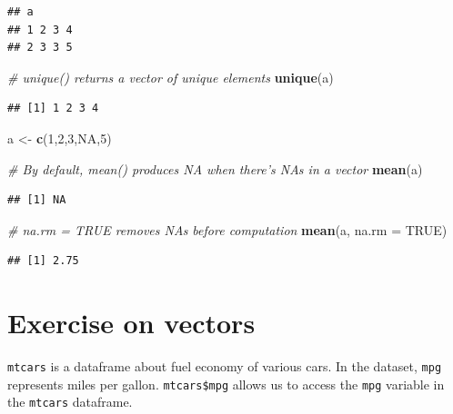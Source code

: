 \documentclass[]{book}
\newenvironment{Shaded}{\begin{snugshade}}{\end{snugshade}}
\newcommand{\CommentTok}[1]{\textcolor[rgb]{0.56,0.35,0.01}{\textit{#1}}}
\newcommand{\DataTypeTok}[1]{\textcolor[rgb]{0.13,0.29,0.53}{#1}}
\newcommand{\DecValTok}[1]{\textcolor[rgb]{0.00,0.00,0.81}{#1}}
\newcommand{\KeywordTok}[1]{\textcolor[rgb]{0.13,0.29,0.53}{\textbf{#1}}}
\newcommand{\NormalTok}[1]{#1}
\newcommand{\OtherTok}[1]{\textcolor[rgb]{0.56,0.35,0.01}{#1}}
\newcommand{\StringTok}[1]{\textcolor[rgb]{0.31,0.60,0.02}{#1}}
\begin{document}
\begin{verbatim}
## a
## 1 2 3 4 
## 2 3 3 5
\end{verbatim}

\begin{Shaded}
\begin{Highlighting}[]
\CommentTok{# unique() returns a vector of unique elements}
\KeywordTok{unique}\NormalTok{(a)}
\end{Highlighting}
\end{Shaded}

\begin{verbatim}
## [1] 1 2 3 4
\end{verbatim}

\begin{Shaded}
\begin{Highlighting}[]
\NormalTok{a <-}\StringTok{ }\KeywordTok{c}\NormalTok{(}\DecValTok{1}\NormalTok{,}\DecValTok{2}\NormalTok{,}\DecValTok{3}\NormalTok{,}\OtherTok{NA}\NormalTok{,}\DecValTok{5}\NormalTok{)}
\end{Highlighting}
\end{Shaded}

\begin{Shaded}
\begin{Highlighting}[]
\CommentTok{# By default, mean() produces NA when there's NAs in a vector}
\KeywordTok{mean}\NormalTok{(a)}
\end{Highlighting}
\end{Shaded}

\begin{verbatim}
## [1] NA
\end{verbatim}

\begin{Shaded}
\begin{Highlighting}[]
\CommentTok{# na.rm = TRUE removes NAs before computation}
\KeywordTok{mean}\NormalTok{(a, }\DataTypeTok{na.rm =} \OtherTok{TRUE}\NormalTok{)}
\end{Highlighting}
\end{Shaded}

\begin{verbatim}
## [1] 2.75
\end{verbatim}

\hypertarget{exercise-on-vectors}{%
\section{Exercise on vectors}\label{exercise-on-vectors}}

\texttt{mtcars} is a dataframe about fuel economy of various cars. In the dataset, \texttt{mpg} represents miles per gallon. \texttt{mtcars\$mpg} allows us to access the \texttt{mpg} variable in the \texttt{mtcars} dataframe.
\end{document}
